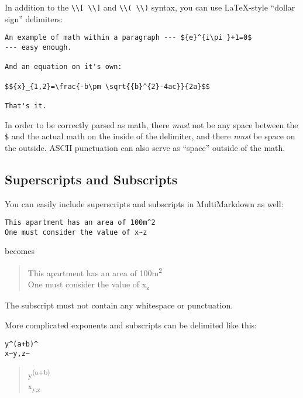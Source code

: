 In addition to the \texttt{\textbackslash{}\textbackslash{}[ \textbackslash{}\textbackslash{}]} and \texttt{\textbackslash{}\textbackslash{}( \textbackslash{}\textbackslash{})} syntax, you can use LaTeX-style ``dollar sign'' delimiters:

\begin{verbatim}
An example of math within a paragraph --- ${e}^{i\pi }+1=0$
--- easy enough.

And an equation on it's own:

$${x}_{1,2}=\frac{-b\pm \sqrt{{b}^{2}-4ac}}{2a}$$

That's it.
\end{verbatim}

In order to be correctly parsed as math, there \emph{must} not be any space between the \texttt{\$} and the actual math on the inside of the delimiter, and there \emph{must} be space on the outside. ASCII punctuation can also serve as ``space'' outside of the math.

\subsection{Superscripts and Subscripts }
\label{superscriptsandsubscripts}

You can easily include superscripts and subscripts in MultiMarkdown as well:

\begin{verbatim}
This apartment has an area of 100m^2
One must consider the value of x~z
\end{verbatim}

becomes

\begin{quote}
This apartment has an area of 100m\textsuperscript{2}\\
One must consider the value of x\textsubscript{z}
\end{quote}

The subscript must not contain any whitespace or punctuation.

More complicated exponents and subscripts can be delimited like this:

\begin{verbatim}
y^(a+b)^
x~y,z~
\end{verbatim}

\begin{quote}
y\textsuperscript{(a+b)}\\
x\textsubscript{y,z}
\end{quote}


